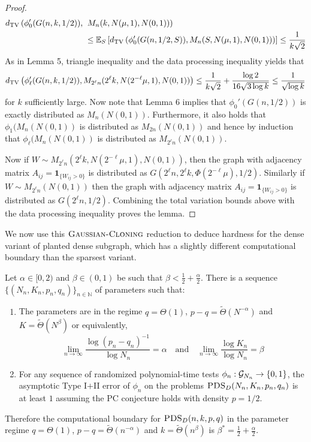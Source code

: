 \documentclass[11pt]{article}
\begin{document}
\begin{proof}
\begin{align*}
d_{\text{TV}}\left( \phi_0'(G(n, k, 1/2)), \right. &\left. M_n(k, N(\mu, 1), N(0, 1)) \right) \\
&\le \mathbb{E}_S \left[ d_{\text{TV}}\left( \phi_0'(G(n, 1/2, S)), M_n(S, N(\mu, 1), N(0, 1)) \right) \right] \le \frac{1}{k\sqrt{2}}
\end{align*}
As in Lemma 5, triangle inequality and the data processing inequality yields that
$$d_{\text{TV}}\left( \phi_\ell'(G(n, k, 1/2)), M_{2^{\ell} n}(2^{\ell} k, N(2^{-\ell}\mu, 1), N(0, 1)) \right) \le \frac{1}{k\sqrt{2}} + \frac{\log 2}{16 \sqrt{3 \log k}} \le \frac{1}{\sqrt{\log k}}$$
for $k$ sufficiently large. Now note that Lemma 6 implies that $\phi_0'(G(n, 1/2))$ is exactly distributed as $M_n(N(0, 1))$. Furthermore, it also holds that $\phi_1(M_n(N(0, 1))$ is distributed as $M_{2n}(N(0, 1))$ and hence by induction that $\phi_\ell(M_n(N(0, 1))$ is distributed as $M_{2^\ell n}(N(0, 1))$. 

Now if $W \sim M_{2^{\ell} n}(2^{\ell} k, N(2^{-\ell}\mu, 1), N(0, 1))$, then the graph with adjacency matrix $A_{ij} = \mathbf{1}_{\{W_{ij} > 0\}}$ is distributed as $G(2^\ell n, 2^\ell k, \Phi(2^{-\ell} \mu),1/2)$. Similarly if $W \sim M_{2^\ell n}(N(0, 1))$ then the graph with adjacency matrix $A_{ij} = \mathbf{1}_{\{W_{ij} > 0\}}$ is distributed as $G(2^\ell n, 1/2)$. Combining the total variation bounds above with the data processing inequality proves the lemma.
\end{proof}

We now use this $\textsc{Gaussian-Cloning}$ reduction to deduce hardness for the dense variant of planted dense subgraph, which has a slightly different computational boundary than the sparsest variant.

\begin{theorem}
Let $\alpha \in [0, 2)$ and $\beta \in (0, 1)$ be such that $\beta < \frac{1}{2} + \frac{\alpha}{2}$. There is a sequence $\{ (N_n, K_n, p_n, q_n) \}_{n \in \mathbb{N}}$ of parameters such that:
\begin{enumerate}
\item The parameters are in the regime $q = \Theta(1)$, $p - q = \tilde{\Theta}(N^{-\alpha})$ and $K = \tilde{\Theta}(N^\beta)$ or equivalently,
$$\lim_{n \to \infty} \frac{\log (p_n - q_n)^{-1}}{\log N_n} = \alpha \quad \text{and} \quad \lim_{n \to \infty} \frac{\log K_n}{\log N_n} = \beta$$
\item For any sequence of randomized polynomial-time tests $\phi_n : \mathcal{G}_{N_n} \to \{0, 1\}$, the asymptotic Type I$+$II error of $\phi_n$ on the problems $\textsc{PDS}_D(N_n, K_n, p_n, q_n)$ is at least $1$ assuming the PC conjecture holds with density $p = 1/2$.
\end{enumerate}
Therefore the computational boundary for $\textsc{PDS}_D(n, k, p, q)$ in the parameter regime $q = \Theta(1)$, $p - q = \tilde{\Theta}(n^{-\alpha})$ and $k = \tilde{\Theta}(n^\beta)$ is $\beta^* = \frac{1}{2} + \frac{\alpha}{2}$.
\end{theorem}
\end{document}

